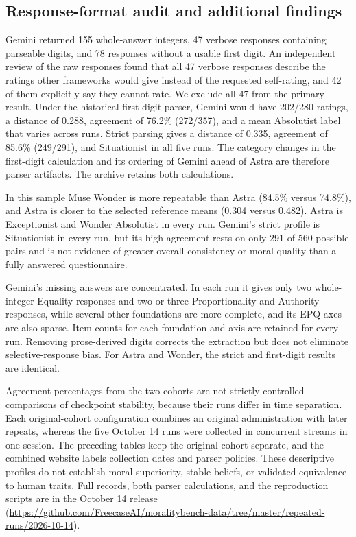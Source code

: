 \documentclass[11pt]{article}
\begin{document}
\subsection{Response-format audit and additional findings}

Gemini returned 155 whole-answer integers, 47 verbose responses containing parseable digits, and 78 responses without a usable first digit. An independent review of the raw responses found that all 47 verbose responses describe the ratings other frameworks would give instead of the requested self-rating, and 42 of them explicitly say they cannot rate. We exclude all 47 from the primary result. Under the historical first-digit parser, Gemini would have 202/280 ratings, a distance of 0.288, agreement of 76.2\% (272/357), and a mean Absolutist label that varies across runs. Strict parsing gives a distance of 0.335, agreement of 85.6\% (249/291), and Situationist in all five runs. The category changes in the first-digit calculation and its ordering of Gemini ahead of Astra are therefore parser artifacts. The archive retains both calculations.

In this sample Muse Wonder is more repeatable than Astra (84.5\% versus 74.8\%), and Astra is closer to the selected reference means (0.304 versus 0.482). Astra is Exceptionist and Wonder Absolutist in every run. Gemini's strict profile is Situationist in every run, but its high agreement rests on only 291 of 560 possible pairs and is not evidence of greater overall consistency or moral quality than a fully answered questionnaire.

Gemini's missing answers are concentrated. In each run it gives only two whole-integer Equality responses and two or three Proportionality and Authority responses, while several other foundations are more complete, and its EPQ axes are also sparse. Item counts for each foundation and axis are retained for every run. Removing prose-derived digits corrects the extraction but does not eliminate selective-response bias. For Astra and Wonder, the strict and first-digit results are identical.

Agreement percentages from the two cohorts are not strictly controlled comparisons of checkpoint stability, because their runs differ in time separation. Each original-cohort configuration combines an original administration with later repeats, whereas the five October 14 runs were collected in concurrent streams in one session. The preceding tables keep the original cohort separate, and the combined website labels collection dates and parser policies. These descriptive profiles do not establish moral superiority, stable beliefs, or validated equivalence to human traits. Full records, both parser calculations, and the reproduction scripts are in the October 14 release (\url{https://github.com/FreecaseAI/moralitybench-data/tree/master/repeated-runs/2026-10-14}).
\end{document}
